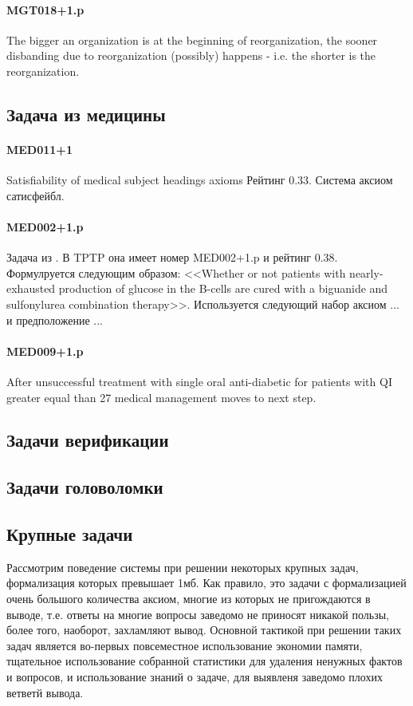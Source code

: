 \paragraph{MGT018+1.p}
The bigger an organization is at the beginning of reorganization, the sooner disbanding due to reorganization (possibly) happens - i.e. the shorter is the reorganization.


\subsection{Задача из медицины}
\paragraph{MED011+1}
Satisfiability of medical subject headings axioms
Рейтинг 0.33. Система аксиом сатисфейбл.


\paragraph{MED002+1.p}
Задача из \cite{med1}. В TPTP она имеет номер MED002+1.p и рейтинг 0.38.
Формулруется следующим образом: <<Whether or not patients with nearly-exhausted production of glucose in the B-cells are cured with a biguanide and sulfonylurea combination therapy>>. Используется следующий набор аксиом ... и предположение ...

\paragraph{MED009+1.p}
After unsuccessful treatment with single oral anti-diabetic for patients with QI greater equal than 27 medical management moves to next step.


\subsection{Задачи верификации}


\subsection{Задачи головоломки}



\subsection{Крупные задачи}
Рассмотрим поведение системы при решении некоторых крупных задач, формализация которых превышает 1мб. Как правило, это задачи с формализацией очень большого количества аксиом, многие из которых не пригождаются в выводе, т.е. ответы на многие вопросы заведомо не приносят никакой пользы, более того, наоборот, захламляют вывод. Основной тактикой при решении таких задач является во-первых повсеместное использование экономии памяти, тщательное использование собранной статистики для удаления ненужных фактов и вопросов, и использование знаний о задаче, для выявленя заведомо плохих ветветй вывода.

